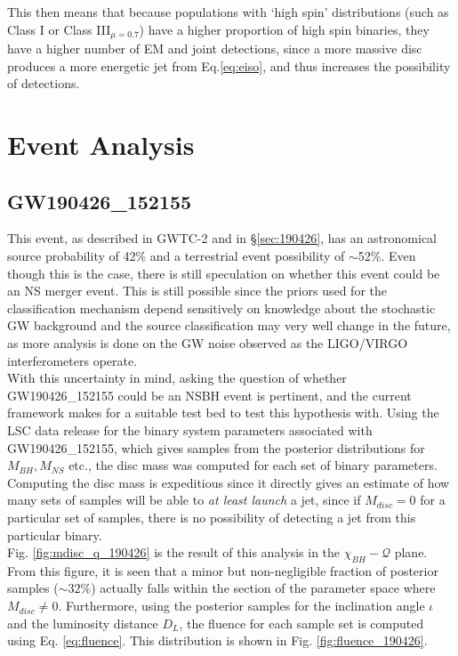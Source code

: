     This then means that because populations with `high spin' distributions (such as
    Class I or Class III$_{\mu = 0.7}$) have a higher proportion of high spin binaries,
    they have a higher number of EM and joint detections, since a more massive disc
    produces a more energetic jet from Eq.\ref{eq:eiso}, and thus increases the
    possibility of detections.

\section{Event Analysis}\label{sec:event_analysis}

    \subsection{GW190426\_152155}\label{ssec:nsbh_190426}

        This event, as described in GWTC-2 and in \S\ref{sec:190426}, has an
        astronomical source probability of 42\% and a terrestrial event possibility of
        $\sim$52\%. Even though this is the case, there is still speculation on whether this
        event could be an NS merger event.  This is still possible since the priors used
        for the classification mechanism depend sensitively on knowledge about the
        stochastic GW background and the source classification may very well change in
        the future, as more analysis is done on the GW noise observed as the LIGO/VIRGO
        interferometers operate.\\
        With this uncertainty in mind, asking the question of whether GW190426\_152155
        could be an NSBH event is pertinent, and the current framework makes for a
        suitable test bed to test this hypothesis with. Using the LSC data release for
        the binary system parameters associated with GW190426\_152155, which gives
        samples from the posterior distributions for $M_{BH}, M_{NS}$ etc., the disc
        mass was computed for each set of binary parameters. Computing the disc mass is
        expeditious since it directly gives an estimate of how many sets of samples will
        be able to \textit{at least launch} a jet, since if $M_{disc} = 0$ for a
        particular set of samples, there is no possibility of detecting a jet from this
        particular binary.\\
        Fig. \ref{fig:mdisc_q_190426} is the result of this analysis in the
        $\chi_{BH}-\mathcal{Q}$ plane. From this figure, it is seen that a minor but
        non-negligible fraction of posterior samples ($\sim$32\%) actually falls within the
        section of the parameter space where $M_{disc} \neq 0$. Furthermore, using the
        posterior samples for the inclination angle $\iota$ and the luminosity distance
        $D_L$, the fluence for each sample set is computed using Eq. \ref{eq:fluence}.
        This distribution is shown in Fig. \ref{fig:fluence_190426}.\\

